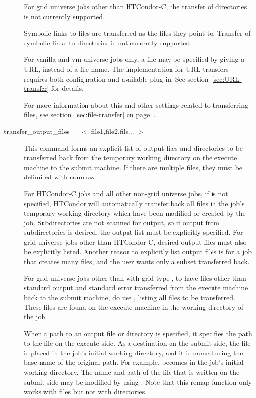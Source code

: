 \begin{description}
For grid universe jobs other than HTCondor-C, the transfer of
directories is not currently supported.

Symbolic links to files are transferred as the files they point to.
Transfer of symbolic links to directories is not currently supported.

For vanilla and vm universe jobs only,
a file may be specified by giving a URL, instead of a file name.
The implementation for URL transfers requires both configuration
and available plug-in.  See section~\ref{sec:URL-transfer} for details. 
 
For more information about this and other settings related to
transferring files, see section~\ref{sec:file-transfer} on
page~\pageref{sec:file-transfer}.


\label{man-condor-submit-transfer-output-files}
\item[transfer\_output\_files = $<$ file1,file2,file... $>$]
This command forms an explicit list of output files and directories 
to be transferred
back from the temporary working directory on the execute machine to
the submit machine.
If there are multiple files, they must be delimited with commas.

For HTCondor-C jobs and all other non-grid universe jobs,
if  is not specified,
HTCondor will automatically transfer back all files in the job's
temporary working directory which have been
modified or created by the job.  Subdirectories are not scanned for
output, so if output from subdirectories is desired, the output list
must be explicitly specified.
For grid universe jobs other than HTCondor-C, desired output files must
also be explicitly listed.
Another reason to explicitly list output files is for a job that creates
many files, and the user wants only a subset transferred back.

For grid universe jobs other than with grid type ,
to have files other than standard output and standard error transferred
from the execute machine back to the submit machine,
do use , listing
all files to be transferred.
These files are found on the execute machine in the
working directory of the job.

When a path to an output file or directory is specified,
it specifies the path to the file on the execute side.
As a destination on the submit side,
the file is placed in the job's initial working directory,
and it is named using the base name of the original path.
For example,  becomes  in
the job's initial working directory.
The name and path of the file
that is written on the submit side may be modified by
using . Note that this remap
function only works with files but not with directories. 


\end{description}
